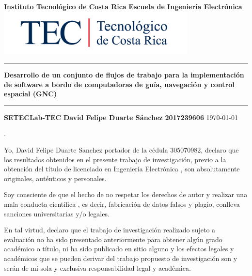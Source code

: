\documentclass[12pt]{article}
\begin{document}
\begin{titlepage}

  \centering
  \vspace{10cm}
  \textbf{\LARGE Instituto Tecnológico de Costa Rica}
  \vspace{2cm}
  \textbf{\LARGE Escuela de Ingeniería Electrónica}
  \vspace{2cm}
  \includegraphics[width=10cm]{logotec/image.png}
  \vspace{2cm}
  \hrule
  \vspace{1cm}
  \textbf{\LARGE Desarrollo de un conjunto de flujos de trabajo para la implementación de software a bordo de computadoras de guía, navegación y control espacial (GNC)}
  \vspace{1cm}
  \hrule
  \vspace{1cm}
  \textbf{\LARGE SETECLab-TEC}
  \vspace{1cm}
  \textbf{\LARGE David Felipe Duarte Sánchez}
  \vspace{1cm}
  \textbf{\LARGE 2017239606}
  \vspace{1cm}
  \today %
\end{titlepage}
.
\par
\vspace{16cm} %

Yo, David Felipe Duarte Sanchez portador de la cédula 305070982, declaro que los resultados obtenidos en el presente trabajo de investigación, previo a la obtención del título de licenciado en Ingeniería Electrónica , son absolutamente originales, auténticos y personales.

Soy consciente de que el hecho de no respetar los derechos de autor y realizar una mala conducta científica , es decir, fabricación de datos falsos y plagio, conlleva sanciones universitarias y/o legales.

En tal virtud, declaro que el trabajo de investigación realizado sujeto a evaluación no ha sido presentado anteriormente para obtener algún grado académico o título, ni ha sido publicado en sitio alguno y los efectos legales y académicos que se pueden derivar del trabajo propuesto de investigación son y serán de mi sola y exclusiva responsabilidad legal y académica.
\end{document}
